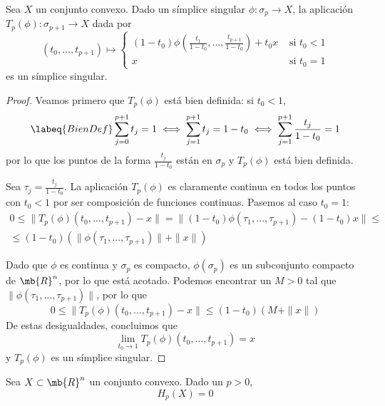 \begin{lemma}
Sea $X$ un conjunto convexo. Dado un símplice singular $\phi\colon \sigma_{p} \to
X$, la aplicación $T_p(\phi)\colon \sigma_{p+1} \to X$ dada por
\[(t_0,\dots,t_{p+1})\mapsto
\begin{cases}
\displaystyle(1-t_0)
\phi\left(\frac{t_1}{1-t_0},\dots,\frac{t_{p+1}}{1-t_0}\right)+t_0x
&\mbox{ si }t_0 < 1\\
x & \mbox{ si }t_0=1
\end{cases}\]
es un símplice singular.
\end{lemma}

\begin{proof}
Veamos primero que $T_p(\phi)$ está bien definida: si $t_0 < 1$,
\begin{equation}\labeq{BienDef}
\sum^{p+1}_{j=0}t_j=
1 \iff \sum^{p+1}_{j=1}t_j=
1-t_0 \iff \sum^{p+1}_{j=1}\frac{t_j}{1-t_0}=1
\end{equation}
por lo que los puntos de la forma $\frac{t_j}{1-t_0}$ están en $\sigma_p$ y
$T_p(\phi)$ está bien definida.

Sea $\tau_j=\frac{t_j}{1-t_0}$. La aplicación $T_p(\phi)$ es claramente continua
en todos los puntos con $t_0 < 1$ por ser composición de funciones continuas.
Pasemos al caso $t_0=1$:
\begin{multline*}
0	\leq \|T_p(\phi)(t_0,\dots,t_{p+1})-x\|=
\|(1-t_0)\phi(\tau_1,\dots,\tau_{p+1})-(1-t_0)x\|\leq\\
	\leq (1-t_0)(\|\phi(\tau_1,\dots,\tau_{p+1})\|+\|x\|)
\end{multline*}

Dado que $\phi$ es continua y $\sigma_p$ es compacto, $\phi(\sigma_p)$ es un
subconjunto compacto de $\mb{R}^n$, por lo que está acotado. Podemos encontrar un
$M > 0$ tal que $\|\phi(\tau_1,\dots,\tau_{p+1})\|$, por lo que
\[0 \leq \|T_p(\phi)(t_0,\dots,t_{p+1})-x\| \leq (1-t_0)(M+\|x\|)\]
De estas desigualdades, concluimos que
\[\lim_{t_0 \to 1}T_p(\phi)(t_0,\dots,t_{p+1})=x\]
y $T_p(\phi)$ es un símplice singular.
\end{proof}

\begin{theorem}
Sea $X \subset \mb{R}^n$ un conjunto convexo. Dado un $p > 0$,
\[H_p(X)=0\]
\end{theorem}

